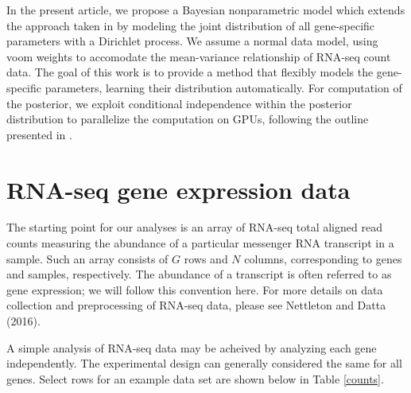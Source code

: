 In the present article, we propose a Bayesian nonparametric model which extends the approach taken in \citet{liu} by modeling the joint distribution of all gene-specific parameters with a Dirichlet process. We assume a normal data model, using voom weights to accomodate the mean-variance relationship of RNA-seq count data. The goal of this work is to provide a method that flexibly models the gene-specific parameters, learning their distribution automatically. For computation of the posterior, we exploit conditional independence within the posterior distribution to parallelize the computation on GPUs, following the outline presented in \citet{suchard}.


\section{RNA-seq gene expression data}
\label{sec:data}
The starting point for our analyses is an array of RNA-seq total aligned read counts measuring the abundance of a particular messenger RNA transcript in a sample. Such an array consists of $G$ rows and $N$ columns, corresponding to genes and samples, respectively. The abundance of a transcript is often referred to as gene expression; we will follow this convention here. For more details on data collection and preprocessing of RNA-seq data, please see Nettleton and Datta (2016).

A simple analysis of RNA-seq data may be acheived by analyzing each gene independently. The experimental design can generally considered the same for all genes. Select rows for an example data set are shown below in Table \ref{counts}.

